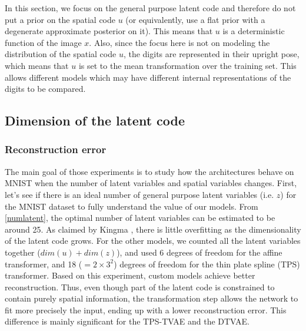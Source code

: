 \documentclass[letterpaper, twoside]{article}
\begin{document}
In this section, we focus on the general purpose latent code and therefore do not put a prior on the spatial code $u$ (or equivalently, use a flat prior with a degenerate approximate posterior on it). This means that $u$ is a deterministic function of the image $x$. Also, since the focus here is not on modeling the distribution of the spatial code $u$, the digits are represented in their upright pose, which means that $u$ is set to the mean transformation over the training set. This allows different models which may have different internal representations of the digits to be compared.

\subsection{Dimension of the latent code}
\subsubsection{Reconstruction error}

The main goal of those experiments is to study how the architectures behave on MNIST when the number of latent variables and spatial variables changes. First, let's see if there is an ideal number of general purpose latent variables (i.e. $z$) for the MNIST dataset to fully understand the value of our models. From \ref{numlatent}, the optimal number of latent variables can be estimated to be around 25. As claimed by Kingma \cite{Kingma.aevb}, there is little overfitting as the dimensionality of the latent code grows. For the other models, we counted all the latent variables together ($dim(u) + dim(z)$), and used 6 degrees of freedom for the affine transformer, and 18 ($=2\times 3^2$) degrees of freedom for the thin plate spline (TPS) transformer. Based on this experiment, custom models achieve better reconstruction. Thus, even though part of the latent code is constrained to contain purely spatial information, the transformation step allows the network to fit more precisely the input, ending up with a lower reconstruction error. This difference is mainly significant for the TPS-TVAE and the DTVAE.\\
\end{document}
